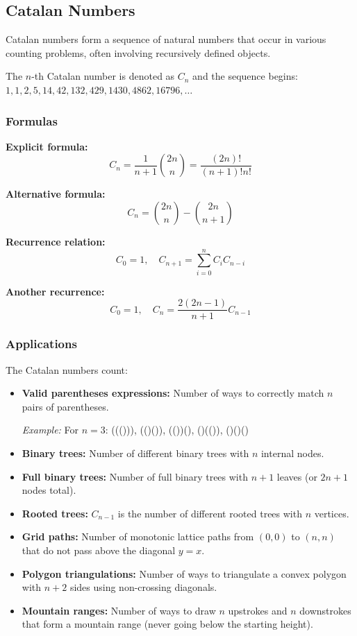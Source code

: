 \subsection{Catalan Numbers}

Catalan numbers form a sequence of natural numbers that occur in various counting problems, often involving recursively defined objects.

The $n$-th Catalan number is denoted as $C_n$ and the sequence begins: $1, 1, 2, 5, 14, 42, 132, 429, 1430, 4862, 16796, \ldots$

\subsubsection{Formulas}

\textbf{Explicit formula:}
\[ C_n = \frac{1}{n+1}\binom{2n}{n} = \frac{(2n)!}{(n+1)!n!} \]

\textbf{Alternative formula:}
\[ C_n = \binom{2n}{n} - \binom{2n}{n+1} \]

\textbf{Recurrence relation:}
\[ C_0 = 1, \quad C_{n+1} = \sum_{i=0}^{n} C_i C_{n-i} \]

\textbf{Another recurrence:}
\[ C_0 = 1, \quad C_n = \frac{2(2n-1)}{n+1}C_{n-1} \]

\subsubsection{Applications}

The Catalan numbers count:

\begin{itemize}
    \item \textbf{Valid parentheses expressions:} Number of ways to correctly match $n$ pairs of parentheses.

    \textit{Example:} For $n=3$: ((())), (()()), (())(), ()(()), ()()()

    \item \textbf{Binary trees:} Number of different binary trees with $n$ internal nodes.

    \item \textbf{Full binary trees:} Number of full binary trees with $n+1$ leaves (or $2n+1$ nodes total).

    \item \textbf{Rooted trees:} $C_{n-1}$ is the number of different rooted trees with $n$ vertices.

    \item \textbf{Grid paths:} Number of monotonic lattice paths from $(0,0)$ to $(n,n)$ that do not pass above the diagonal $y = x$.

    \item \textbf{Polygon triangulations:} Number of ways to triangulate a convex polygon with $n+2$ sides using non-crossing diagonals.

    \item \textbf{Mountain ranges:} Number of ways to draw $n$ upstrokes and $n$ downstrokes that form a mountain range (never going below the starting height).
\end{itemize}


